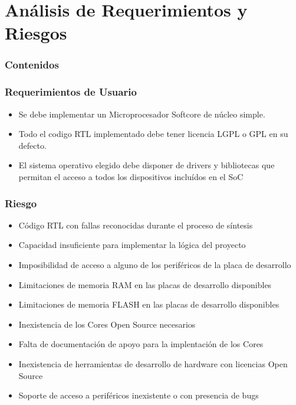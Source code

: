\documentclass[xcolor=dvipsnames,mathserif,9pt]{beamer}
\begin{document}
  \section{Análisis de Requerimientos y Riesgos}

  \begin{frame}
    \frametitle{Contenidos}
    \tableofcontents [currentsection]
  \end{frame}
  
  \begin{frame}[allowframebreaks] 
 \frametitle{Requerimientos de Usuario}

    \begin{itemize}\itemsep=0.25cm
	\item Se debe implementar un Microprocesador Softcore de núcleo simple.

	\item Todo el codigo RTL implementado debe tener licencia LGPL o GPL en su defecto.
	\item El sistema operativo elegido debe disponer de drivers y bibliotecas que permitan el acceso a todos los dispositivos incluídos en el SoC
    \end{itemize}
  \end{frame}
  \begin{frame}%
	\frametitle{Riesgo}
    \begin{itemize}\itemsep=0.25cm
	\item Código RTL con fallas reconocidas durante el proceso de síntesis
	\item Capacidad insuficiente para implementar la lógica del proyecto  
	\item Imposibilidad de acceso a alguno de los periféricos de la placa de desarrollo
	\item Limitaciones de memoria RAM en las placas de desarrollo disponibles
	\item Limitaciones de memoria FLASH en las placas de desarrollo disponibles
	\item Inexistencia de los Cores Open Source necesarios 
	\item Falta de documentación de apoyo para la implentación de los Cores
	\item  Inexistencia de herramientas de desarrollo de hardware con licencias Open Source
	\item Soporte de acceso a periféricos inexistente o con presencia de bugs
   \end{itemize}

  \end{frame}
\end{document}
